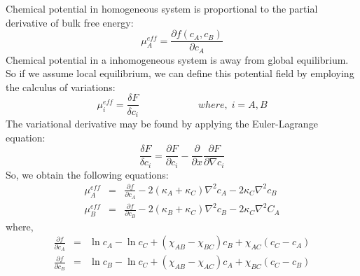 \documentclass[12pt]{iiscthes}
\theoremstyle{definition}
\theoremstyle{definition}
\theoremstyle{remark}
\begin{document}
Chemical potential in homogeneous system is proportional to the partial derivative of bulk free energy:
\begin{equation}\label{62}
\mu_A^{eff}=\frac{\partial f\left(c_A,c_B\right)}{\partial c_A}
\end{equation}
Chemical potential in a inhomogeneous system is away from global equilibrium. So if we assume local equilibrium, we can define this potential field by employing the calculus of variations:
\begin{equation}\label{63}
\mu_i^{eff}=\frac{\delta F}{\delta c_i}\hspace{1in} where,\; i = A,B
\end{equation}
The variational derivative may be found by applying the Euler-Lagrange equation:
\begin{equation}\label{64}
\frac{\delta F}{\delta c_i} = \frac{\partial F}{\partial c_i}-\frac{\partial}{\partial x}\frac{\partial F}{\partial \nabla c_i}
\end{equation}
So, we obtain the following equations:
\begin{eqnarray}\label{65}
\mu_A^{eff}&=&\frac{\partial f}{\partial c_A}-2\left(\kappa_A+\kappa_C\right)\nabla^2c_A - 2\kappa_C\nabla^2c_B\nonumber\\
\mu_B^{eff}&=&\frac{\partial f}{\partial c_B}-2\left(\kappa_B+\kappa_C\right)\nabla^2c_B-2\kappa_C\nabla^2 C_A
\end{eqnarray}
where,
\begin{eqnarray}\label{66}
\frac{\partial f}{\partial c_A}&=&\ln c_A-\ln c_C+\left(\chi_{AB}-\chi_{BC}\right)c_B+\chi_{AC}\left(c_C-c_A\right)\nonumber\\
\frac{\partial f}{\partial c_B}&=&\ln c_B-\ln c_C+\left(\chi_{AB}-\chi_{AC}\right)c_A+\chi_{BC}\left(c_C-c_B\right)
\end{eqnarray}
\end{document}
